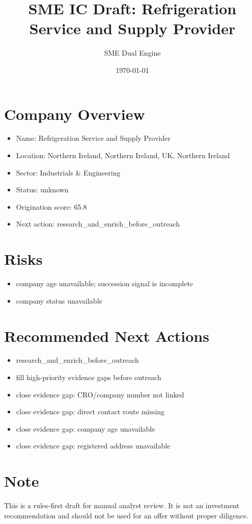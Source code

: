 \documentclass[11pt,a4paper]{article}
\title{SME IC Draft: Refrigeration Service and Supply Provider}
\author{SME Dual Engine}
\date{\today}
\begin{document}
\maketitle
\section*{Company Overview}
\begin{itemize}[leftmargin=1.4em]
\item Name: Refrigeration Service and Supply Provider
\item Location: Northern Ireland, Northern Ireland, UK, Northern Ireland
\item Sector: Industrials \& Engineering
\item Status: unknown
\item Origination score: 65.8
\item Next action: research\_and\_enrich\_before\_outreach
\end{itemize}
\section*{Risks}
\begin{itemize}[leftmargin=1.4em]
\item company age unavailable; succession signal is incomplete
\item company status unavailable
\end{itemize}
\section*{Recommended Next Actions}
\begin{itemize}[leftmargin=1.4em]
\item research\_and\_enrich\_before\_outreach
\item fill high-priority evidence gaps before outreach
\item close evidence gap: CRO/company number not linked
\item close evidence gap: direct contact route missing
\item close evidence gap: company age unavailable
\item close evidence gap: registered address unavailable
\end{itemize}
\section*{Note}
This is a rules-first draft for manual analyst review. It is not an investment
recommendation and should not be used for an offer without proper diligence.
\end{document}
